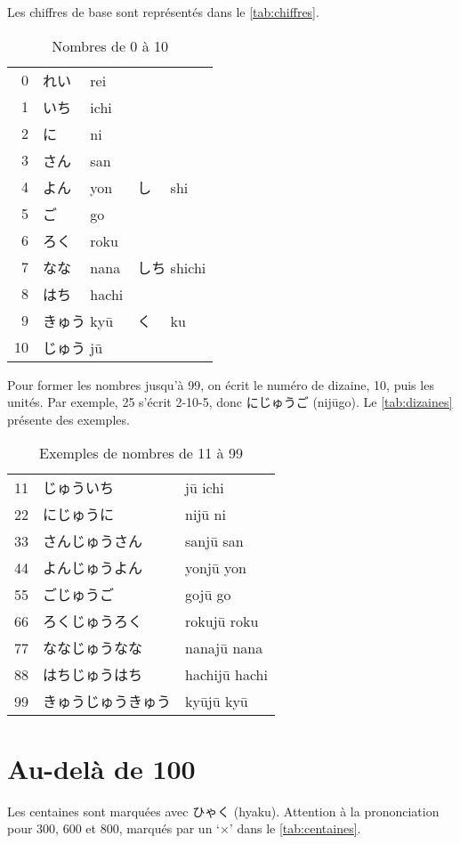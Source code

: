 \documentclass[a4paper,10pt,french,openany]{memoir}
\begin{document}
Les chiffres de base sont représentés dans le \autoref{tab:chiffres}.

\begin{table}[htbp]
 \centering
 \begin{tabular}{rll}
  0 & れい　 rei\\
  1 & いち　 ichi\\
  2 & に　　 ni\\
  3 & さん　 san\\
  4 & よん　 yon & し　 shi\\
  5 & ご　　 go\\
  6 & ろく　 roku\\
  7 & なな　 nana & しち shichi\\
  8 & はち　 hachi\\
  9 & きゅう kyū & く　 ku\\
 10 & じゅう jū
 \end{tabular}
 \caption{Nombres de 0 à 10}
 \label{tab:chiffres}
\end{table}

Pour former les nombres jusqu'à 99, on écrit le numéro de dizaine, 10, puis les unités. Par exemple, 25 s'écrit 2-10-5, donc にじゅうご (nijūgo). Le \autoref{tab:dizaines} présente des exemples.

\begin{table}[htbp]
 \centering
 \begin{tabular}{cll}
  11 & じゅういち      &jū ichi\\
  22 & にじゅうに      &nijū ni\\
  33 & さんじゅうさん   &sanjū san\\
  44 & よんじゅうよん   &yonjū yon\\
  55 & ごじゅうご      &gojū go\\
  66 & ろくじゅうろく   &rokujū roku\\
  77 & ななじゅうなな   &nanajū nana\\
  88 & はちじゅうはち   &hachijū hachi\\
  99 & きゅうじゅうきゅう&kyūjū kyū\\
 \end{tabular}
 \caption{Exemples de nombres de 11 à 99}
 \label{tab:dizaines}
\end{table}

\section{Au-delà de 100}

Les centaines sont marquées avec ひゃく (hyaku). Attention à la prononciation pour 300, 600 et 800, marqués par un `×' dans le \autoref{tab:centaines}.
\end{document}
